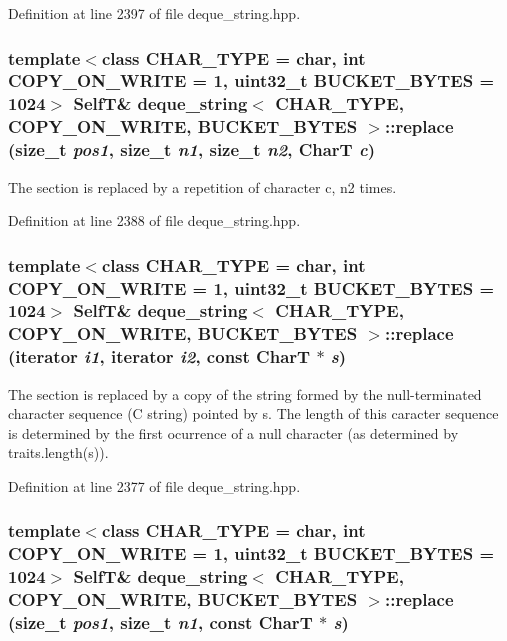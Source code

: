 Definition at line 2397 of file deque\_\-string.hpp.\hypertarget{classdeque__string_25e331d55a7113b19422c129816ff428}{
\subsubsection[{replace}]{\setlength{\rightskip}{0pt plus 5cm}template$<$class CHAR\_\-TYPE  = char, int COPY\_\-ON\_\-WRITE = 1, uint32\_\-t BUCKET\_\-BYTES = 1024$>$ {\bf SelfT}\& {\bf deque\_\-string}$<$ CHAR\_\-TYPE, COPY\_\-ON\_\-WRITE, BUCKET\_\-BYTES $>$::replace (size\_\-t {\em pos1}, \/  size\_\-t {\em n1}, \/  size\_\-t {\em n2}, \/  CharT {\em c})}}
\label{classdeque__string_25e331d55a7113b19422c129816ff428}


The section is replaced by a repetition of character c, n2 times. 

Definition at line 2388 of file deque\_\-string.hpp.\hypertarget{classdeque__string_4ce63da89c419a5a03d1661ac5328f0c}{
\subsubsection[{replace}]{\setlength{\rightskip}{0pt plus 5cm}template$<$class CHAR\_\-TYPE  = char, int COPY\_\-ON\_\-WRITE = 1, uint32\_\-t BUCKET\_\-BYTES = 1024$>$ {\bf SelfT}\& {\bf deque\_\-string}$<$ CHAR\_\-TYPE, COPY\_\-ON\_\-WRITE, BUCKET\_\-BYTES $>$::replace (iterator {\em i1}, \/  iterator {\em i2}, \/  const CharT $\ast$ {\em s})}}
\label{classdeque__string_4ce63da89c419a5a03d1661ac5328f0c}


The section is replaced by a copy of the string formed by the null-terminated character sequence (C string) pointed by s. The length of this caracter sequence is determined by the first ocurrence of a null character (as determined by traits.length(s)). 

Definition at line 2377 of file deque\_\-string.hpp.\hypertarget{classdeque__string_bd1b08c6f2c1c0c77d8a64a56ebe2a09}{
\subsubsection[{replace}]{\setlength{\rightskip}{0pt plus 5cm}template$<$class CHAR\_\-TYPE  = char, int COPY\_\-ON\_\-WRITE = 1, uint32\_\-t BUCKET\_\-BYTES = 1024$>$ {\bf SelfT}\& {\bf deque\_\-string}$<$ CHAR\_\-TYPE, COPY\_\-ON\_\-WRITE, BUCKET\_\-BYTES $>$::replace (size\_\-t {\em pos1}, \/  size\_\-t {\em n1}, \/  const CharT $\ast$ {\em s})}}
\label{classdeque__string_bd1b08c6f2c1c0c77d8a64a56ebe2a09}


